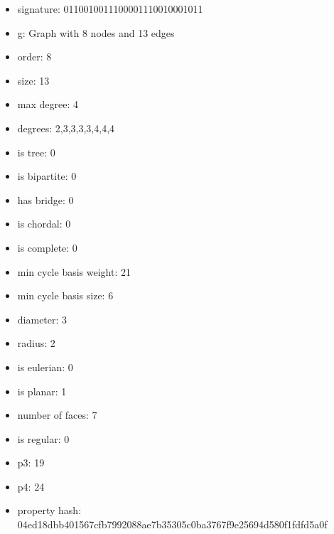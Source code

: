 \begin{itemize}
\item signature: 0110010011100001110010001011
\item g: Graph with 8 nodes and 13 edges
\item order: 8
\item size: 13
\item max degree: 4
\item degrees: 2,3,3,3,3,4,4,4
\item is tree: 0
\item is bipartite: 0
\item has bridge: 0
\item is chordal: 0
\item is complete: 0
\item min cycle basis weight: 21
\item min cycle basis size: 6
\item diameter: 3
\item radius: 2
\item is eulerian: 0
\item is planar: 1
\item number of faces: 7
\item is regular: 0
\item p3: 19
\item p4: 24
\item property hash: 04ed18dbb401567cfb7992088ae7b35305c0ba3767f9e25694d580f1fdfd5a0f
\end{itemize}
\newpage
\begin{figure}
\end{figure}
